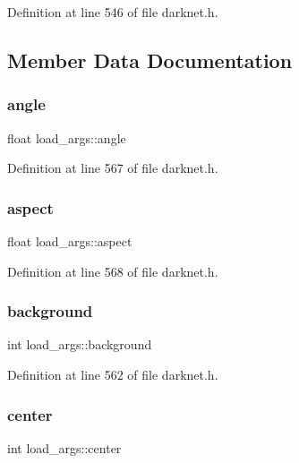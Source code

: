 Definition at line 546 of file darknet.\+h.



\subsection{Member Data Documentation}
\mbox{\label{structload__args_a6cc2a92701869043348a92cb810edbbd}} 
\subsubsection{\texorpdfstring{angle}{angle}}
{\footnotesize\ttfamily float load\+\_\+args\+::angle}



Definition at line 567 of file darknet.\+h.

\mbox{\label{structload__args_a0077414b1db970d5eecfc2c756fc328b}} 
\subsubsection{\texorpdfstring{aspect}{aspect}}
{\footnotesize\ttfamily float load\+\_\+args\+::aspect}



Definition at line 568 of file darknet.\+h.

\mbox{\label{structload__args_a05d8a43c38b9e069a854cc6a7c7625db}} 
\subsubsection{\texorpdfstring{background}{background}}
{\footnotesize\ttfamily int load\+\_\+args\+::background}



Definition at line 562 of file darknet.\+h.

\mbox{\label{structload__args_a84a09ba4d910b1129e92dd91fa01d6f0}} 
\subsubsection{\texorpdfstring{center}{center}}
{\footnotesize\ttfamily int load\+\_\+args\+::center}



